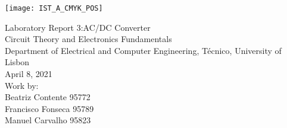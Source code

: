 
\thispagestyle {empty}

\texttt{[image: IST\_A\_CMYK\_POS]}

\begin{center}
%
\vspace{1.0cm}

\vspace{1cm}
{\FontLb Laboratory Report 3:AC/DC Converter} \\ %
\vspace{1cm}
{\FontSn Circuit Theory and Electronics Fundamentals} \\
\vspace{1cm}
{\FontSn Department of Electrical and Computer Engineering, Técnico, University of Lisbon} \\ %
\vspace{1cm}
{\FontSn April 8, 2021} \\ %
\vspace{1cm}
{\FontSn Work by:} \\ 
\vspace{0.5cm}
{\FontSn Beatriz Contente 95772} \\ 
\vspace{0.5cm}
{\FontSn Francisco Fonseca 95789} \\ 
\vspace{0.5cm}
{\FontSn Manuel Carvalho 95823} \\ 
%
\end{center}
